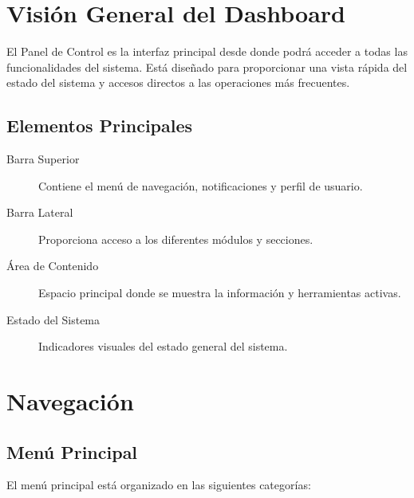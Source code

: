 

\section{Visión General del Dashboard}

El Panel de Control es la interfaz principal desde donde podrá acceder a todas las funcionalidades del sistema. Está diseñado para proporcionar una vista rápida del estado del sistema y accesos directos a las operaciones más frecuentes.

\subsection{Elementos Principales}

\begin{description}
    \item[Barra Superior] Contiene el menú de navegación, notificaciones y perfil de usuario.
    \item[Barra Lateral] Proporciona acceso a los diferentes módulos y secciones.
    \item[Área de Contenido] Espacio principal donde se muestra la información y herramientas activas.
    \item[Estado del Sistema] Indicadores visuales del estado general del sistema.
\end{description}

\section{Navegación}

\subsection{Menú Principal}

El menú principal está organizado en las siguientes categorías:

